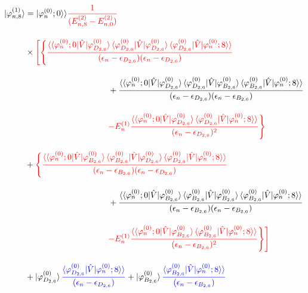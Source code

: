 \begin{align}
    \ket{\varphi_{n,8}^{(1)}}
    &=
    |\varphi^{(0)}_n;0\rangle\rangle
    \textcolor{red}{\frac{1}{(E^{(2)}_{n,8}-E^{(2)}_{n,0})}}\nn[10pt]
    &\times
    \textcolor{red}{\Biggl[\Biggl\{
    \frac{\langle\braket{\varphi^{(0)}_{n};0|\hat{V}|\varphi^{(0)}_{D_{2,6}}}
    \langle{\varphi^{(0)}_{D_{2,6}}|\hat{V}|\varphi^{(0)}_{D_{2,6}}}\rangle
    \braket{\varphi^{(0)}_{D_{2,6}}|\hat{V}|\varphi^{(0)}_n;8}\rangle}
    {(\epsilon_n-\epsilon_{D_{2,6}})(\epsilon_n-\epsilon_{D_{2,6}})}}\nn[10pt]
    &\hspace{100pt}
    +{\frac{\langle\braket{\varphi^{(0)}_{n};0|\hat{V}|\varphi^{(0)}_{D_{2,6}}}
    \langle{\varphi^{(0)}_{D_{2,6}}|\hat{V}|\varphi^{(0)}_{B_{2,6}}}\rangle
    \braket{\varphi^{(0)}_{B_{2,6}}|\hat{V}|\varphi^{(0)}_n;8}\rangle}
    {(\epsilon_n-\epsilon_{D_{2,6}})(\epsilon_n-\epsilon_{B_{2,6}})}}\nn[10pt]
    &\hspace{100pt}
    \textcolor{red}{-E^{(1)}_n
    \frac{\langle\braket{\varphi^{(0)}_{n};0|\hat{V}|\varphi^{(0)}_{D_{2,6}}}
    \braket{\varphi^{(0)}_{D_{2,6}}|\hat{V}|\varphi^{(0)}_n;8}\rangle}{(\epsilon_n-\epsilon_{D_{2,6}})^2}
    \Biggr\}}
    \nn[10pt]
    &+\textcolor{red}{\Biggl\{
    \frac{\langle\braket{\varphi^{(0)}_{n};0|\hat{V}|\varphi^{(0)}_{B_{2,6}}}
    \langle{\varphi^{(0)}_{B_{2,6}}|\hat{V}|\varphi^{(0)}_{D_{2,6}}}\rangle
    \braket{\varphi^{(0)}_{D_{2,6}}|\hat{V}|\varphi^{(0)}_n;8}\rangle}
    {(\epsilon_n-\epsilon_{B_{2,6}})(\epsilon_n-\epsilon_{D_{2,6}})}}\nn[10pt]
    &\hspace{100pt}
    +{\frac{\langle\braket{\varphi^{(0)}_{n};0|\hat{V}|\varphi^{(0)}_{B_{2,6}}}
    \langle{\varphi^{(0)}_{B_{2,6}}|\hat{V}|\varphi^{(0)}_{B_{2,6}}}\rangle
    \braket{\varphi^{(0)}_{B_{2,6}}|\hat{V}|\varphi^{(0)}_n;8}\rangle}
    {(\epsilon_n-\epsilon_{B_{2,6}})(\epsilon_n-\epsilon_{B_{2,6}})}}\nn[10pt]
    &\hspace{100pt}
    \textcolor{red}{-E^{(1)}_n
    \frac{\langle\braket{\varphi^{(0)}_{n};0|\hat{V}|\varphi^{(0)}_{B_{2,6}}}
    \braket{\varphi^{(0)}_{B_{2,6}}|\hat{V}|\varphi^{(0)}_n;8}\rangle}{(\epsilon_n-\epsilon_{B_{2,6}})^2}
    \Biggr\}\Biggr]}
    \nn[10pt]
    &+
    \ket{\varphi^{(0)}_{D_{2,6}}}
    \textcolor{blue}{
    \frac{\braket{\varphi^{(0)}_{D_{2,6}}|\hat{V}|\varphi^{(0)}_n;8}\rangle}{(\epsilon_n-\epsilon_{D_{2,6}})}}
    +
    \ket{\varphi^{(0)}_{B_{2,6}}}
    \textcolor{blue}{
    \frac{\braket{\varphi^{(0)}_{B_{2,6}}|\hat{V}|\varphi^{(0)}_n;8}\rangle}{(\epsilon_n-\epsilon_{B_{2,6}})}}
\end{align}

